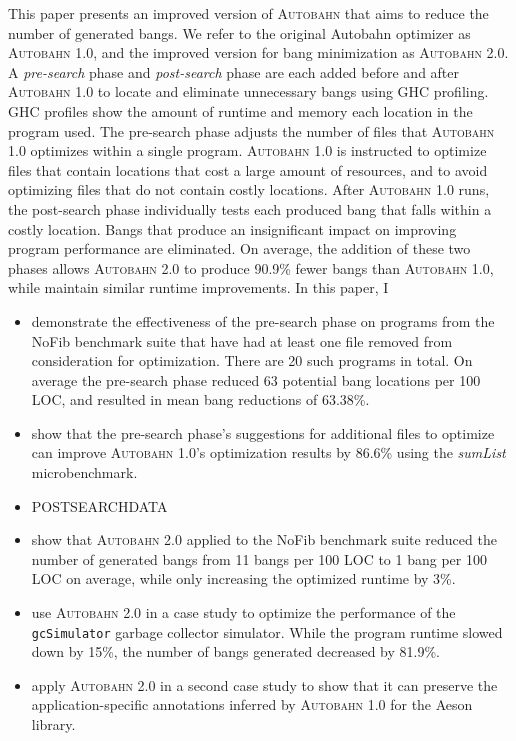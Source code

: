 \documentclass[format=sigplan, review=true]{acmart}
\newcommand{\Ao}[0]{\textsc{Autobahn 1.0}}
\newcommand{\At}[0]{\textsc{Autobahn 2.0}}
\newcommand{\preopt}[0]{pre-search}
\newcommand{\postopt}[0]{post-search}
\begin{document}
This paper presents an improved version of \textsc{Autobahn} that aims to reduce the number of generated bangs. We refer to the original Autobahn optimizer as \Ao{}, and the improved version for bang minimization as \At{}. A \textit{\preopt{}} phase and \textit{\postopt{}} phase are each added before and after \Ao{} to locate and eliminate unnecessary bangs using GHC profiling. GHC profiles show the amount of runtime and memory each location in the program used. The \preopt{} phase adjusts the number of files that \Ao{} optimizes within a single program. \Ao{} is instructed to optimize files that contain locations that cost a large amount of resources, and to avoid optimizing files that do not contain costly locations. After \Ao{} runs, the \postopt{} phase individually tests each produced bang that falls within a costly location. Bangs that produce an insignificant impact on improving program performance are eliminated. On average, the addition of these two phases allows \At{} to produce 90.9\% fewer bangs than \Ao{}, while maintain similar runtime improvements. In this paper, I
\begin{itemize}
  \item demonstrate the effectiveness of the \preopt{} phase on programs from the NoFib benchmark suite that have had at least one file removed from consideration for optimization. There are 20 such programs in total. On average the \preopt{} phase reduced 63 potential bang locations per 100 LOC, and resulted in mean bang reductions of 63.38\%. 
  \item show that the \preopt{} phase's suggestions for additional files to optimize can improve \Ao{}'s optimization results by 86.6\% using the \textit{sumList} microbenchmark.
  \item POSTSEARCHDATA
  \item show that \At{} applied to the NoFib benchmark suite reduced the number of generated bangs from 11 bangs per 100 LOC to 1 bang per 100 LOC on average, while only increasing the optimized runtime by 3\%.
  \item use \At{} in a case study to optimize the performance of the \texttt{gcSimulator} garbage collector simulator. While the program runtime slowed down by 15\%, the number of bangs generated decreased by 81.9\%.
  \item apply \At{} in a second case study to show that it can preserve the application-specific annotations inferred by \Ao{} for the Aeson library. 
\end{itemize}
\end{document}
